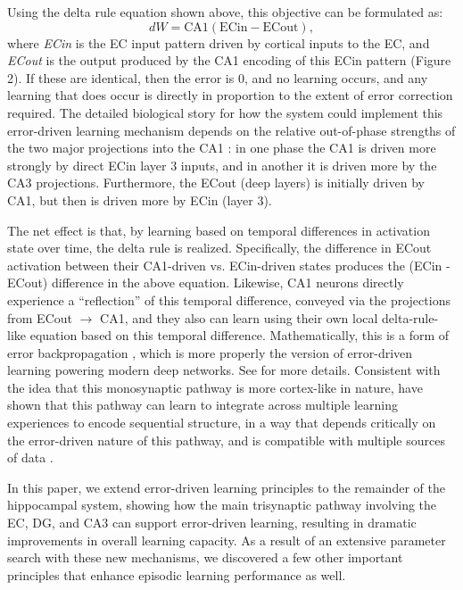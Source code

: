 \documentclass[11pt,twoside]{article}
\newif\myifpdf
\begin{document}
Using the delta rule equation shown above, this objective can be formulated as:
\begin{equation}
dW = \mbox{CA1} (\mbox{ECin} - \mbox{ECout}),
\end{equation}
where \emph{ECin} is the EC input pattern driven by cortical inputs to the EC, and \emph{ECout} is the output produced by the CA1 encoding of this ECin pattern (Figure 2).  If these are identical, then the error is 0, and no learning occurs, and any learning that does occur is directly in proportion to the extent of error correction required.  The detailed biological story for how the system could implement this error-driven learning mechanism depends on the relative out-of-phase strengths of the two major projections into the CA1 \citep{HasselmoBodelonWyble02}: in one phase the CA1 is driven more strongly by direct ECin layer 3 inputs, and in another it is driven more by the CA3 projections.  Furthermore, the ECout (deep layers) is initially driven by CA1, but then is driven more by ECin (layer 3).

The net effect is that, by learning based on temporal differences in activation state over time, the delta rule is realized.  Specifically, the difference in ECout activation between their CA1-driven vs. ECin-driven states produces the (ECin - ECout) difference in the above equation.  Likewise, CA1 neurons directly experience a ``reflection'' of this temporal difference, conveyed via the projections from ECout $\rightarrow$ CA1, and they also can learn using their own local delta-rule-like equation based on this temporal difference.  Mathematically, this is a form of error backpropagation \citep{OReilly96,WhittingtonBogacz19}, which is more properly the version of error-driven learning powering modern deep networks.  See \citet{KetzMorkondaOReilly13} for more details.  Consistent with the idea that this monosynaptic pathway is more cortex-like in nature, \citet{SchapiroTurk-BrowneBotvinickEtAl17} have shown that this pathway can learn to integrate across multiple learning experiences to encode sequential structure, in a way that depends critically on the error-driven nature of this pathway, and is compatible with multiple sources of data \citep{SchapiroTurk-BrowneNormanEtAl16}.

In this paper, we extend error-driven learning principles to the remainder of the hippocampal system, showing how the main trisynaptic pathway involving the EC, DG, and CA3 can support error-driven learning, resulting in dramatic improvements in overall learning capacity.  As a result of an extensive parameter search with these new mechanisms, we discovered a few other important principles that enhance episodic learning performance as well.
\end{document}
